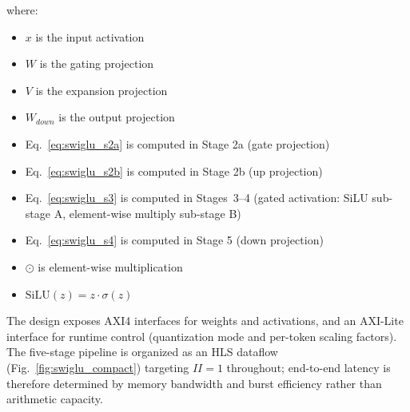\documentclass[manuscript,]{acmart} %
\begin{document}
where:
\begin{itemize}
    \item $x$ is the input activation
    \item $W$ is the gating projection
    \item $V$ is the expansion projection
    \item $W_{down}$ is the output projection
    \item Eq.~\eqref{eq:swiglu_s2a} is computed in Stage 2a (gate projection)
    \item Eq.~\eqref{eq:swiglu_s2b} is computed in Stage 2b (up projection)
    \item Eq.~\eqref{eq:swiglu_s3} is computed in Stages~3--4 (gated activation: SiLU sub-stage A, element-wise multiply sub-stage B)
    \item Eq.~\eqref{eq:swiglu_s4} is computed in Stage 5 (down projection)
    \item $\odot$ is element-wise multiplication
    \item $\text{SiLU}(z) = z \cdot \sigma(z)$
\end{itemize}
The design exposes AXI4 interfaces for weights and activations, and an AXI-Lite interface for runtime control (quantization mode and per-token scaling factors). The five-stage pipeline is organized as an HLS dataflow (Fig.~\ref{fig:swiglu_compact}) targeting $II=1$ throughout; end-to-end latency is therefore determined by memory bandwidth and burst efficiency rather than arithmetic capacity.
\end{document}
